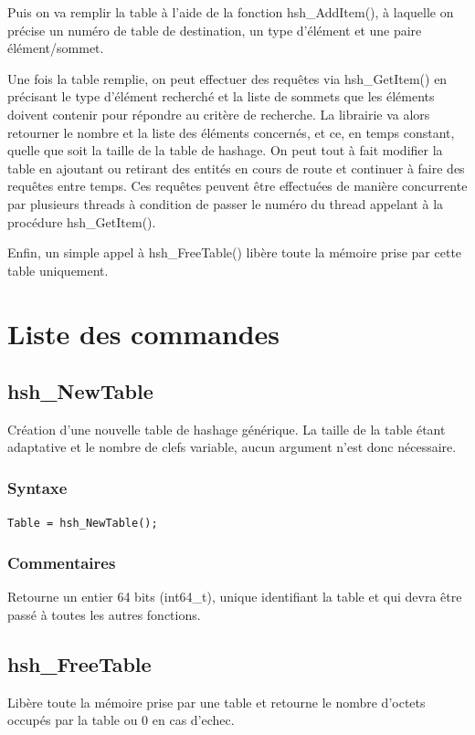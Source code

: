 \documentclass[a4paper,12pt]{article}
\begin{document}
Puis on va remplir la table à l'aide de la fonction hsh\_AddItem(), à laquelle on précise un numéro de table de destination, un type d'élément et une paire élément/sommet.

Une fois la table remplie, on peut effectuer des requêtes via hsh\_GetItem() en précisant le type d'élément recherché et la liste de sommets que les éléments doivent contenir pour répondre au critère de recherche.
La librairie va alors retourner le nombre et la liste des éléments concernés, et ce, en temps constant, quelle que soit la taille de la table de hashage.
On peut tout à fait modifier la table en ajoutant ou retirant des entités en cours de route et continuer à faire des requêtes entre temps.
Ces requêtes peuvent être effectuées de manière concurrente par plusieurs threads à condition de passer le numéro du thread appelant à la procédure hsh\_GetItem().

Enfin, un simple appel à hsh\_FreeTable() libère toute la mémoire prise par cette table uniquement.


%
%

\section{Liste des commandes}


\subsection{hsh\_NewTable}
Création d'une nouvelle table de hashage générique.
La taille de la table étant adaptative et le nombre de clefs variable, aucun argument n'est donc nécessaire.

\subsubsection*{Syntaxe}
{\tt Table = hsh\_NewTable();}

\subsubsection*{Commentaires}
Retourne un entier 64 bits (int64\_t), unique identifiant la table et qui devra être passé à toutes les autres fonctions.


\subsection{hsh\_FreeTable}
Libère toute la mémoire prise par une table et retourne le nombre d'octets occupés par la table ou 0 en cas d'echec.
\end{document}
